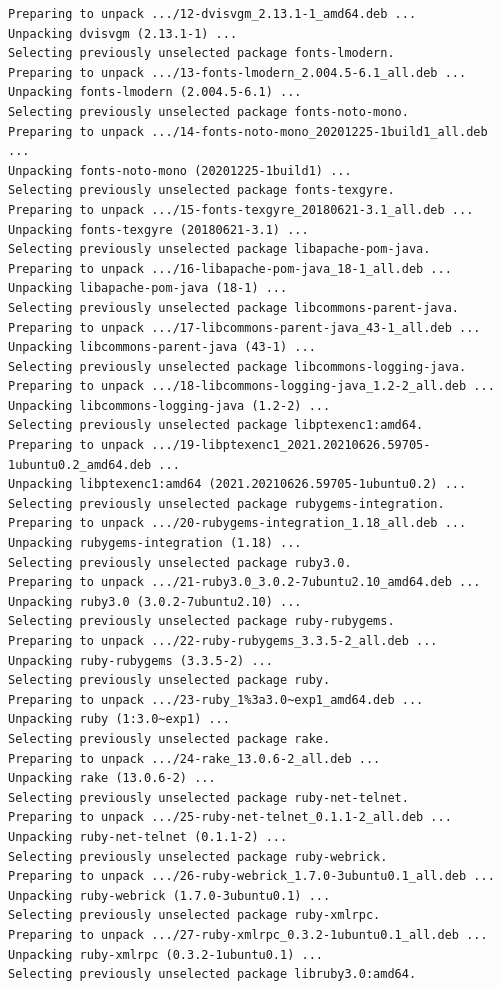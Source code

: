 \documentclass[
  11pt,
  letterpaper,
]{book}
\begin{document}
\begin{verbatim}
Preparing to unpack .../12-dvisvgm_2.13.1-1_amd64.deb ...
Unpacking dvisvgm (2.13.1-1) ...
Selecting previously unselected package fonts-lmodern.
Preparing to unpack .../13-fonts-lmodern_2.004.5-6.1_all.deb ...
Unpacking fonts-lmodern (2.004.5-6.1) ...
Selecting previously unselected package fonts-noto-mono.
Preparing to unpack .../14-fonts-noto-mono_20201225-1build1_all.deb ...
Unpacking fonts-noto-mono (20201225-1build1) ...
Selecting previously unselected package fonts-texgyre.
Preparing to unpack .../15-fonts-texgyre_20180621-3.1_all.deb ...
Unpacking fonts-texgyre (20180621-3.1) ...
Selecting previously unselected package libapache-pom-java.
Preparing to unpack .../16-libapache-pom-java_18-1_all.deb ...
Unpacking libapache-pom-java (18-1) ...
Selecting previously unselected package libcommons-parent-java.
Preparing to unpack .../17-libcommons-parent-java_43-1_all.deb ...
Unpacking libcommons-parent-java (43-1) ...
Selecting previously unselected package libcommons-logging-java.
Preparing to unpack .../18-libcommons-logging-java_1.2-2_all.deb ...
Unpacking libcommons-logging-java (1.2-2) ...
Selecting previously unselected package libptexenc1:amd64.
Preparing to unpack .../19-libptexenc1_2021.20210626.59705-1ubuntu0.2_amd64.deb ...
Unpacking libptexenc1:amd64 (2021.20210626.59705-1ubuntu0.2) ...
Selecting previously unselected package rubygems-integration.
Preparing to unpack .../20-rubygems-integration_1.18_all.deb ...
Unpacking rubygems-integration (1.18) ...
Selecting previously unselected package ruby3.0.
Preparing to unpack .../21-ruby3.0_3.0.2-7ubuntu2.10_amd64.deb ...
Unpacking ruby3.0 (3.0.2-7ubuntu2.10) ...
Selecting previously unselected package ruby-rubygems.
Preparing to unpack .../22-ruby-rubygems_3.3.5-2_all.deb ...
Unpacking ruby-rubygems (3.3.5-2) ...
Selecting previously unselected package ruby.
Preparing to unpack .../23-ruby_1%3a3.0~exp1_amd64.deb ...
Unpacking ruby (1:3.0~exp1) ...
Selecting previously unselected package rake.
Preparing to unpack .../24-rake_13.0.6-2_all.deb ...
Unpacking rake (13.0.6-2) ...
Selecting previously unselected package ruby-net-telnet.
Preparing to unpack .../25-ruby-net-telnet_0.1.1-2_all.deb ...
Unpacking ruby-net-telnet (0.1.1-2) ...
Selecting previously unselected package ruby-webrick.
Preparing to unpack .../26-ruby-webrick_1.7.0-3ubuntu0.1_all.deb ...
Unpacking ruby-webrick (1.7.0-3ubuntu0.1) ...
Selecting previously unselected package ruby-xmlrpc.
Preparing to unpack .../27-ruby-xmlrpc_0.3.2-1ubuntu0.1_all.deb ...
Unpacking ruby-xmlrpc (0.3.2-1ubuntu0.1) ...
Selecting previously unselected package libruby3.0:amd64.

\end{verbatim}
\end{document}
